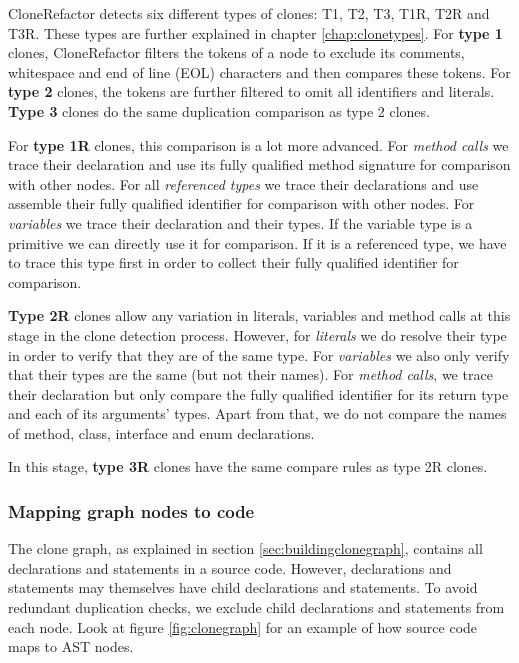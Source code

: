 CloneRefactor detects six different types of clones: T1, T2, T3, T1R, T2R and T3R. These types are further explained in chapter \ref{chap:clonetypes}. For \textbf{type 1} clones, CloneRefactor filters the tokens of a node to exclude its comments, whitespace and end of line (EOL) characters and then compares these tokens. For \textbf{type 2} clones, the tokens are further filtered to omit all identifiers and literals. \textbf{Type 3} clones do the same duplication comparison as type 2 clones.

For \textbf{type 1R} clones, this comparison is a lot more advanced. For \textit{method calls} we trace their declaration and use its fully qualified method signature for comparison with other nodes. For all \textit{referenced types} we trace their declarations and use assemble their fully qualified identifier for comparison with other nodes. For \textit{variables} we trace their declaration and their types. If the variable type is a primitive we can directly use it for comparison. If it is a referenced type, we have to trace this type first in order to collect their fully qualified identifier for comparison.

\textbf{Type 2R} clones allow any variation in literals, variables and method calls at this stage in the clone detection process. However, for \textit{literals} we do resolve their type in order to verify that they are of the same type. For \textit{variables} we also only verify that their types are the same (but not their names). For \textit{method calls}, we trace their declaration but only compare the fully qualified identifier for its return type and each of its arguments' types. Apart from that, we do not compare the names of method, class, interface and enum declarations.

In this stage, \textbf{type 3R} clones have the same compare rules as type 2R clones.

\subsubsection{Mapping graph nodes to code}
The clone graph, as explained in section \ref{sec:buildingclonegraph}, contains all declarations and statements in a source code. However, declarations and statements may themselves have child declarations and statements. To avoid redundant duplication checks, we exclude child declarations and statements from each node. Look at figure \ref{fig:clonegraph} for an example of how source code maps to AST nodes.

